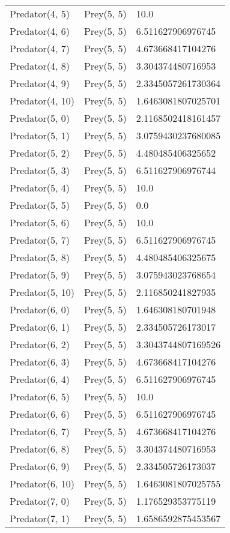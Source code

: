 \begin{longtable}{| p{} | p{} | p{} |}
Predator(4, 5) & Prey(5, 5) &10.0\\
Predator(4, 6) & Prey(5, 5) &6.511627906976745\\
Predator(4, 7) & Prey(5, 5) &4.673668417104276\\
Predator(4, 8) & Prey(5, 5) &3.304374480716953\\
Predator(4, 9) & Prey(5, 5) &2.3345057261730364\\
Predator(4, 10) & Prey(5, 5) &1.6463081807025701\\
Predator(5, 0) & Prey(5, 5) &2.1168502418161457\\
Predator(5, 1) & Prey(5, 5) &3.0759430237680085\\
Predator(5, 2) & Prey(5, 5) &4.480485406325652\\
Predator(5, 3) & Prey(5, 5) &6.511627906976744\\
Predator(5, 4) & Prey(5, 5) &10.0\\
Predator(5, 5) & Prey(5, 5) &0.0\\
Predator(5, 6) & Prey(5, 5) &10.0\\
Predator(5, 7) & Prey(5, 5) &6.511627906976745\\
Predator(5, 8) & Prey(5, 5) &4.480485406325675\\
Predator(5, 9) & Prey(5, 5) &3.075943023768654\\
Predator(5, 10) & Prey(5, 5) &2.116850241827935\\
Predator(6, 0) & Prey(5, 5) &1.646308180701948\\
Predator(6, 1) & Prey(5, 5) &2.334505726173017\\
Predator(6, 2) & Prey(5, 5) &3.3043744807169526\\
Predator(6, 3) & Prey(5, 5) &4.673668417104276\\
Predator(6, 4) & Prey(5, 5) &6.511627906976745\\
Predator(6, 5) & Prey(5, 5) &10.0\\
Predator(6, 6) & Prey(5, 5) &6.511627906976745\\
Predator(6, 7) & Prey(5, 5) &4.673668417104276\\
Predator(6, 8) & Prey(5, 5) &3.304374480716953\\
Predator(6, 9) & Prey(5, 5) &2.334505726173037\\
Predator(6, 10) & Prey(5, 5) &1.6463081807025755\\
Predator(7, 0) & Prey(5, 5) &1.176529353775119\\
Predator(7, 1) & Prey(5, 5) &1.6586592875453567\\

\end{longtable}
